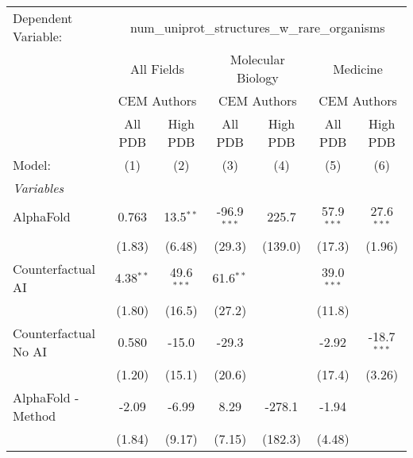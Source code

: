 \begingroup
\centering
\begin{tabular}{lcccccc}
   \tabularnewline \midrule \midrule
   Dependent Variable: & \multicolumn{6}{c}{num\_uniprot\_structures\_w\_rare\_organisms}\\
 & \multicolumn{2}{c}{All Fields} & \multicolumn{2}{c}{Molecular Biology} & \multicolumn{2}{c}{Medicine} \\
\cmidrule(lr){2-3} \cmidrule(lr){4-5} \cmidrule(lr){6-7}
 & \multicolumn{2}{c}{CEM Authors} & \multicolumn{2}{c}{CEM Authors} & \multicolumn{2}{c}{CEM Authors} \\
\cmidrule(lr){2-3} \cmidrule(lr){4-5} \cmidrule(lr){6-7}
 & \multicolumn{1}{c}{All PDB} & \multicolumn{1}{c}{High PDB} & \multicolumn{1}{c}{All PDB} & \multicolumn{1}{c}{High PDB} & \multicolumn{1}{c}{All PDB} & \multicolumn{1}{c}{High PDB} \\
\cmidrule(lr){2-2} \cmidrule(lr){3-3} \cmidrule(lr){4-4} \cmidrule(lr){5-5} \cmidrule(lr){6-6} \cmidrule(lr){7-7}
   Model:                                                     & (1)         & (2)          & (3)           & (4)     & (5)          & (6)\\  
   \midrule
   \emph{Variables}\\
   AlphaFold                                                  & 0.763       & 13.5$^{**}$  & -96.9$^{***}$ & 225.7   & 57.9$^{***}$ & 27.6$^{***}$\\   
                                                              & (1.83)      & (6.48)       & (29.3)        & (139.0) & (17.3)       & (1.96)\\   
   Counterfactual AI                                          & 4.38$^{**}$ & 49.6$^{***}$ & 61.6$^{**}$   &         & 39.0$^{***}$ &   \\   
                                                              & (1.80)      & (16.5)       & (27.2)        &         & (11.8)       &   \\   
   Counterfactual No AI                                       & 0.580       & -15.0        & -29.3         &         & -2.92        & -18.7$^{***}$\\   
                                                              & (1.20)      & (15.1)       & (20.6)        &         & (17.4)       & (3.26)\\   
   AlphaFold - Method                                         & -2.09       & -6.99        & 8.29          & -278.1  & -1.94        &   \\   
                                                              & (1.84)      & (9.17)       & (7.15)        & (182.3) & (4.48)       &   \\   

\end{tabular}
